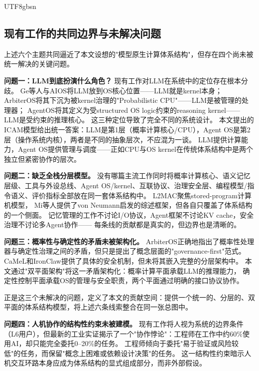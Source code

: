 \documentclass[11pt,a4paper]{article}
\begin{document}
\begin{CJK*}{UTF8}{gbsn}
\subsection{现有工作的共同边界与未解决问题}
\label{sec:related-gap}

上述六个主题共同逼近了本文设想的"模型原生计算体系结构"，但存在四个尚未被统一解决的关键问题。

\textbf{问题一：LLM到底扮演什么角色？}
现有工作对LLM在系统中的定位存在根本分歧。
Ge等人与AIOS将LLM放到OS核心位置\cite{ge2023llmos,mei2024aios}——LLM就是kernel本身；
ArbiterOS将其下沉为被kernel治理的"Probabilistic CPU"\cite{arbiteros2025}——LLM是被管理的处理器；
AgentOS将其定义为受structured OS logic约束的reasoning kernel\cite{agentos2025}——LLM是受约束的推理核心。
这三种定位导致了完全不同的系统设计。
本文提出的ICAM模型给出统一答案：LLM是第1层（概率计算核心/CPU），Agent OS是第2层（操作系统内核），两者是不同的抽象层次，不应混为一谈。
LLM提供计算能力，Agent OS提供管理与调度——正如CPU与OS kernel在传统体系结构中是两个独立但紧密协作的层次。

\textbf{问题二：缺乏全栈分层模型。}
没有哪篇主流工作同时将概率计算核心、语义记忆层级、工具与外设总线、Agent OS/kernel、互联协议、治理安全层、编程模型/指令语义、评价指标全部放在同一套体系结构中。
L2MAC\cite{holt2024l2mac}聚焦stored-program计算机模型，
Mi等人\cite{mi2025llmagentscomputersystems}提供了von Neumann启发的综述框架，但各自只覆盖了体系结构的一个侧面。
记忆管理的工作不讨论I/O协议，Agent框架不讨论KV cache，安全治理不讨论多Agent协作——%
每条线的贡献都是真实的，但边界也是清晰的。

\textbf{问题三：概率性与确定性的矛盾未被架构化。}
ArbiterOS\cite{arbiteros2025}正确地指出了概率性处理器与确定性治理之间的矛盾，但只是提出了概念层面的"governance-first"范式。
CaMeL\cite{debenedetti2025camel}和IronClaw\cite{ironclaw2025}提供了具体的安全机制，但未将其嵌入完整的分层架构中。
本文通过"双平面架构"将这一矛盾架构化：概率计算平面承载LLM的推理能力，
确定性控制平面承载OS的管理与安全职责，两个平面通过明确的接口协议协作。

正是这三个未解决的问题，定义了本文的贡献空间：提供一个统一的、分层的、双平面的体系结构模型，将上述六条线索整合在同一张总图中。

\textbf{问题四：人机协作的结构性约束未被建模。}
现有工作将人视为系统的边界条件（L6用户），但最新的工业实证揭示了一个"协作悖论"：工程师在工作中约60\%使用AI，却只能完全委托0--20\%的任务\cite{anthropic2026agenticreport}。
工程师倾向于委托"易于验证或风险较低"的任务，而保留"概念上困难或依赖设计决策"的任务。
这一结构性约束暗示人机交互环路本身应成为体系结构的显式组成部分，而非外部假设。%

\end{CJK*}
\end{document}
